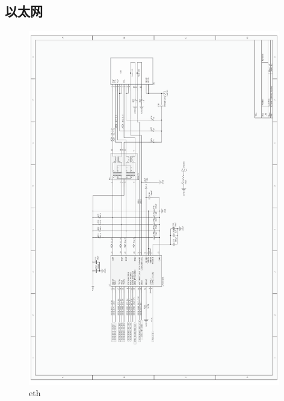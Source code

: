 \documentclass[titlepage]{article}
\begin{document}
 \subsection{以太网}
 \begin{figure}[ht]
  \centering
 \includegraphics[width=11cm]{eth.pdf}
 \caption{eth}
 \end{figure}

 \newpage
\end{document}
